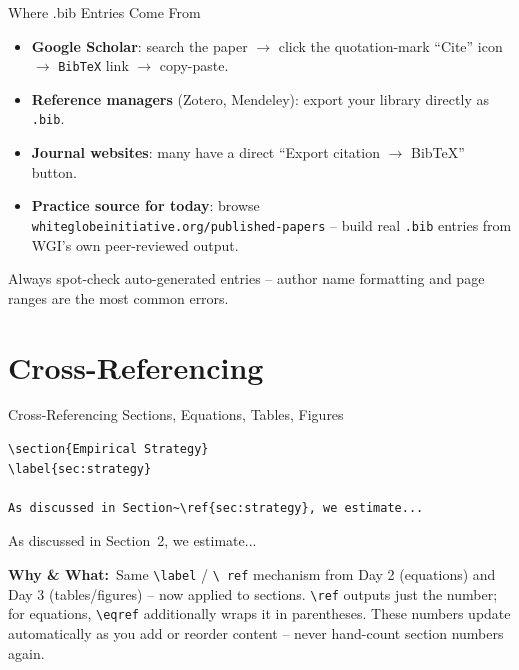 \documentclass[11pt,aspectratio=169]{beamer}
\newcommand{\whybox}[1]{%
  \vspace{2pt}
  {\scriptsize\raggedright\textcolor{red!55!black}{\textbf{Why \& What:}}~#1\par}
}
\begin{document}
\begin{frame}{Where .bib Entries Come From}
  \small
  \begin{itemize}
    \item \textbf{Google Scholar}: search the paper $\rightarrow$ click the quotation-mark ``Cite'' icon $\rightarrow$ \texttt{BibTeX} link $\rightarrow$ copy-paste.
    \item \textbf{Reference managers} (Zotero, Mendeley): export your library directly as \texttt{.bib}.
    \item \textbf{Journal websites}: many have a direct ``Export citation $\rightarrow$ BibTeX'' button.
    \item \textbf{Practice source for today}: browse
      \texttt{whiteglobeinitiative.org/published-papers} -- build real
      \texttt{.bib} entries from WGI's own peer-reviewed output.
  \end{itemize}
  \vspace{4pt}
  Always spot-check auto-generated entries -- author name formatting
  and page ranges are the most common errors.
\end{frame}

\section{Cross-Referencing}

\begin{frame}[fragile]{Cross-Referencing Sections, Equations, Tables, Figures}
  \begin{lstlisting}
\section{Empirical Strategy}
\label{sec:strategy}

As discussed in Section~\ref{sec:strategy}, we estimate...
  \end{lstlisting}
  \begin{outputbox}
    \small As discussed in Section~2, we estimate...
  \end{outputbox}
  \whybox{Same \texttt{\textbackslash label} / \texttt{\textbackslash
  ref} mechanism from Day 2 (equations) and Day 3 (tables/figures) --
  now applied to sections. \texttt{\textbackslash ref} outputs just the
  number; for equations, \texttt{\textbackslash eqref} additionally
  wraps it in parentheses. These numbers update automatically as you
  add or reorder content -- never hand-count section numbers again.}
\end{frame}
\end{document}
